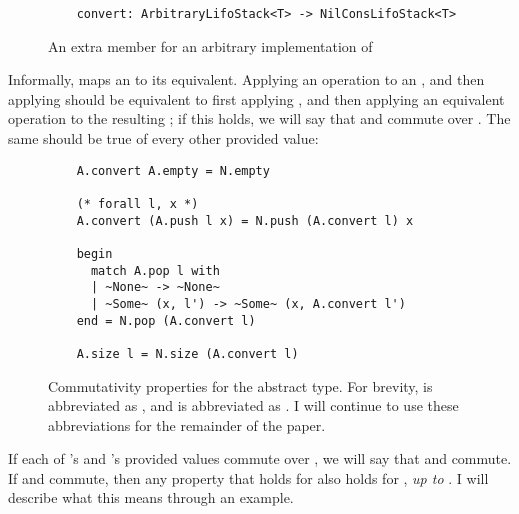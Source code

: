 \documentclass[12pt]{article}
\begin{document}
  \begin{figure}[H]
    \begin{lstlisting}
    convert: ArbitraryLifoStack<T> -> NilConsLifoStack<T>
    \end{lstlisting}
    \caption{An extra member for an arbitrary implementation of }
  \end{figure}

  \noindent Informally,  maps an  to its  equivalent. Applying an  operation to an , and then applying  should be equivalent to first applying , and then applying an equivalent  operation to the resulting ; if this holds, we will say that  and  commute over . The same should be true of every other  provided value:

  \begin{figure}[H]
    \centering
    \begin{lstlisting}
    A.convert A.empty = N.empty

    (* forall l, x *)
    A.convert (A.push l x) = N.push (A.convert l) x

    begin
      match A.pop l with
      | ~None~ -> ~None~
      | ~Some~ (x, l') -> ~Some~ (x, A.convert l')
    end = N.pop (A.convert l)

    A.size l = N.size (A.convert l)
    \end{lstlisting}
    \caption{Commutativity properties for the  abstract type. For brevity,  is abbreviated as , and  is abbreviated as . I will continue to use these abbreviations for the remainder of the paper.}
  \end{figure}

  \noindent If each of 's and 's provided values commute over , we will say that  and  commute. If  and  commute, then any property that holds for  also holds for , \textit{up to} . I will describe what this means through an example.

   \bigskip
\end{document}
